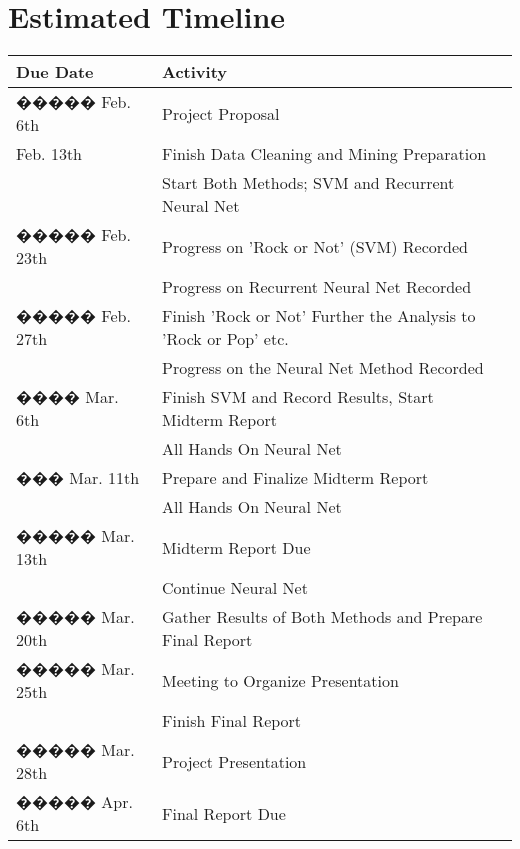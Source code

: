 \documentclass[journal]{IEEEtran}
\begin{document}
\newpage


\section{Estimated Timeline}

\begin{table}[h!]
  \begin{center}
    \label{tab:table1}
    \begin{tabular}{l|l|l|}
      \textbf{Due Date} & \textbf{Activity}\\

      \hline
����� 	Feb.	6th & Project Proposal\\
	Feb. 13th & Finish Data Cleaning and Mining Preparation\\
	& Start Both Methods; SVM and Recurrent Neural Net\\
 �����	Feb. 	23th & Progress on 'Rock or Not' (SVM) Recorded\\
	& Progress on Recurrent Neural Net Recorded\\
 �����	Feb. 	27th & Finish 'Rock or Not' Further the Analysis to 'Rock or Pop' etc.\\
	& Progress on the Neural Net Method Recorded\\
 ����	Mar. 	6th & Finish SVM and Record Results, Start Midterm Report\\
	& All Hands On Neural Net\\
 ���	Mar. 	11th & Prepare and Finalize Midterm Report\\
	& All Hands On Neural Net\\
 �����	Mar. 	13th & Midterm Report Due \\
	& Continue Neural Net\\
 �����	Mar. 	20th & Gather Results of Both Methods and Prepare Final Report\\
 �����	Mar. 	25th & Meeting to Organize Presentation\\
	& Finish Final Report\\
 �����	Mar. 	28th & Project Presentation\\
 �����	Apr. 	6th & Final Report Due\\

    \end{tabular}
  \end{center}
\end{table}
\end{document}
